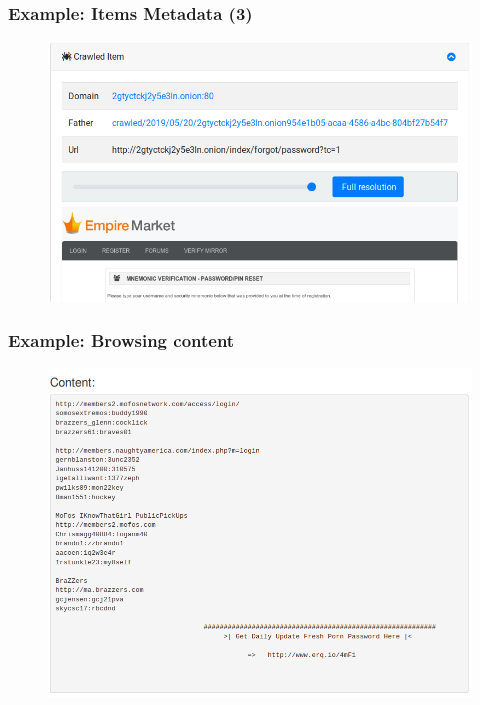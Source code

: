 \documentclass{beamer}
\begin{document}
\begin{frame}
    \frametitle{Example: Items Metadata (3)}
    \begin{figure}
        \includegraphics[scale=0.28, angle=0]{images/ail_17.png}
    \end{figure}
\end{frame}

\begin{frame}
    \frametitle{Example: Browsing content}
    \begin{figure}
        \includegraphics[scale=0.3, angle=0]{images/ail_04.png}
    \end{figure}
\end{frame}
\end{document}
